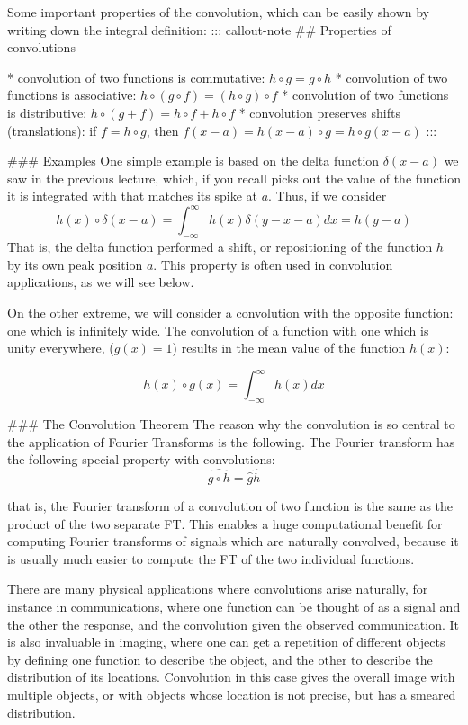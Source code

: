 Some important properties of the convolution, which can be easily shown by writing down the integral definition:
::: callout-note
## Properties of convolutions

*  convolution of two functions is commutative: $h  \circ  g = g  \circ h$
* convolution of two functions is associative: $ h\circ (g \circ f) = (h \circ g) \circ f$ 
* convolution of two functions is distributive: $h  \circ (g + f) = h  \circ f + h  \circ  f $
* convolution preserves shifts (translations): if $ f = h  \circ  g $, then $f(x-a) = h(x-a)  \circ  g = h  \circ  g (x-a)$
:::

### Examples
One simple example is based on the delta function $\delta(x-a)$ we saw in the previous lecture, which, if you recall picks out the value of the function it is integrated with that matches its spike at $a$. Thus, if we consider
$$ h(x)  \circ \delta(x-a) = \int _{-\infty} ^\infty h(x) \delta(y-x-a) dx = h(y-a) $$
That is, the delta function performed a shift, or repositioning of the function $h$ by its own peak position $a$. This property is often used in convolution applications, as we will see below. 

On the other extreme, we will consider a convolution with the opposite function: one which is infinitely wide. The convolution of a function with one which is unity everywhere, ($g(x) = 1$) results in the mean value of the function $h(x)$:

$$ h(x) \circ g(x) = \int _{-\infty} ^\infty h(x)  dx $$

### The Convolution Theorem
The reason why the convolution is so central to the application of Fourier Transforms is the following. The Fourier transform has the following special property with convolutions:
$$ \widehat{g \circ h} = \widehat {g} \widehat {h}$$

that is, the Fourier transform of a convolution of two function is the same as the product of the two separate FT. This enables a huge computational benefit for computing Fourier transforms of signals which are naturally convolved, because it is usually much easier to compute the FT of the two individual functions. 

There are many physical applications where convolutions arise naturally, for instance in communications, where one function can be thought of as a signal and the other the response, and the convolution given the observed communication. It is also invaluable in imaging, where one can get a repetition of different objects by defining one function to describe the object, and the other to describe the distribution of its locations. Convolution in this case gives the overall image with multiple objects, or with objects whose location is not precise, but has a smeared distribution. 


